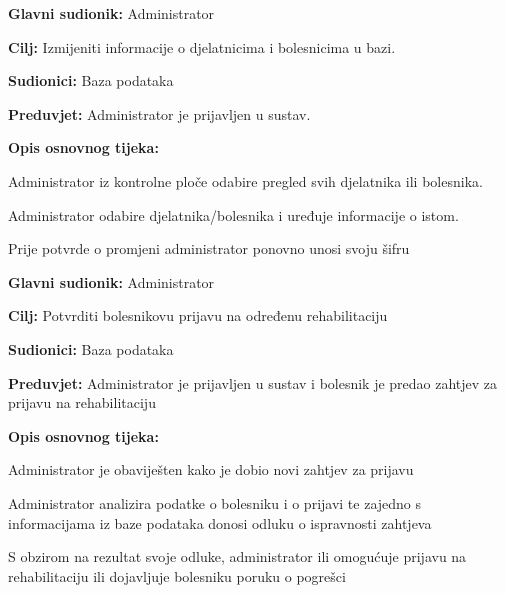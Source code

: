 \documentclass[12pt]{report}
\newenvironment{packed_enum}{
	\begin{enumerate}
		\setlength{\itemsep}{0pt}
		\setlength{\parskip}{0pt}
		\setlength{\parsep}{0pt}
	}{\end{enumerate}}
\begin{document}
	\item \textbf{Glavni sudionik:} Administrator
	\item \textbf{Cilj:} Izmijeniti informacije o djelatnicima i bolesnicima u bazi.
	\item \textbf{Sudionici:} Baza podataka
	\item \textbf{Preduvjet:} Administrator je prijavljen u sustav.
	\item \textbf{Opis osnovnog tijeka:}
	\begin{packed_enum}
		\item Administrator iz kontrolne ploče odabire pregled svih djelatnika ili bolesnika.
		\item Administrator odabire djelatnika/bolesnika i uređuje informacije o istom.
        	\item Prije potvrde o promjeni administrator ponovno unosi svoju šifru
	\end{packed_enum}
\closeusecase


	\item \textbf{Glavni sudionik:} Administrator
 	\item \textbf{Cilj:} Potvrditi bolesnikovu prijavu na određenu rehabilitaciju
  	\item \textbf{Sudionici:} Baza podataka
   	\item \textbf{Preduvjet:} Administrator je prijavljen u sustav i bolesnik je predao zahtjev za prijavu na rehabilitaciju
    	\item \textbf{Opis osnovnog tijeka:}
     	\begin{packed_enum}
      		\item Administrator je obaviješten kako je dobio novi zahtjev za prijavu
		\item Administrator analizira podatke o bolesniku i o prijavi te zajedno s informacijama iz baze podataka donosi odluku o ispravnosti zahtjeva
  		\item S obzirom na rezultat svoje odluke, administrator ili omogućuje prijavu na rehabilitaciju ili dojavljuje bolesniku poruku o pogrešci
    	\end{packed_enum}
\closeusecase
\end{document}
